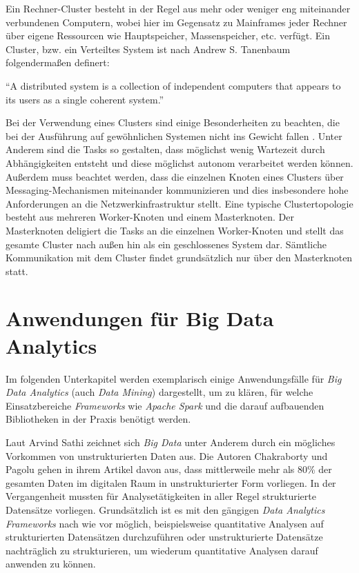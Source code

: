 Ein Rechner-Cluster besteht in der Regel aus mehr oder weniger eng miteinander verbundenen Computern, wobei hier im Gegensatz zu Mainframes jeder Rechner über eigene Ressourcen wie Hauptspeicher, Massenspeicher, etc. verfügt. Ein Cluster, bzw. ein Verteiltes System ist nach Andrew S. Tanenbaum  folgendermaßen definert: 

\enquote{A distributed system is a collection of independent computers that appears to its users as a single coherent system.}

Bei der Verwendung eines Clusters sind einige Besonderheiten zu beachten, die bei der Ausführung auf gewöhnlichen Systemen nicht ins Gewicht fallen . Unter Anderem sind die Tasks so gestalten, dass möglichst wenig Wartezeit durch Abhängigkeiten entsteht und diese möglichst autonom verarbeitet werden können. Außerdem muss beachtet werden, dass die einzelnen Knoten eines Clusters über Messaging-Mechanismen miteinander kommunizieren und dies insbesondere hohe Anforderungen an die Netzwerkinfrastruktur stellt. Eine typische Clustertopologie besteht aus mehreren Worker-Knoten und einem Masterknoten. Der Masterknoten deligiert die Tasks an die einzelnen Worker-Knoten und stellt das gesamte Cluster nach außen hin als ein geschlossenes System dar. Sämtliche Kommunikation mit dem Cluster findet grundsätzlich nur über den Masterknoten statt.


 
\section{Anwendungen für Big Data Analytics}
\label{section:anwendungen für big data analytics}

Im folgenden Unterkapitel werden exemplarisch einige Anwendungsfälle für \textit{Big Data Analytics} (auch \textit{Data Mining}) dargestellt, um zu klären, für welche Einsatzbereiche \textit{Frameworks} wie \textit{Apache Spark} und die darauf aufbauenden Bibliotheken in der Praxis benötigt werden.  

Laut Arvind Sathi  zeichnet sich \textit{Big Data} unter Anderem durch ein mögliches Vorkommen von unstrukturierten Daten aus. Die Autoren Chakraborty und Pagolu gehen in ihrem Artikel  davon aus, dass mittlerweile mehr als 80\% der gesamten Daten im digitalen Raum in unstrukturierter Form vorliegen. In der Vergangenheit mussten für Analysetätigkeiten in aller Regel strukturierte Datensätze vorliegen. Grundsätzlich ist es mit den gängigen \textit{Data Analytics Frameworks} nach wie vor möglich, beispielsweise quantitative Analysen auf strukturierten Datensätzen durchzuführen oder unstrukturierte Datensätze nachträglich zu strukturieren, um wiederum quantitative Analysen darauf anwenden zu können.

